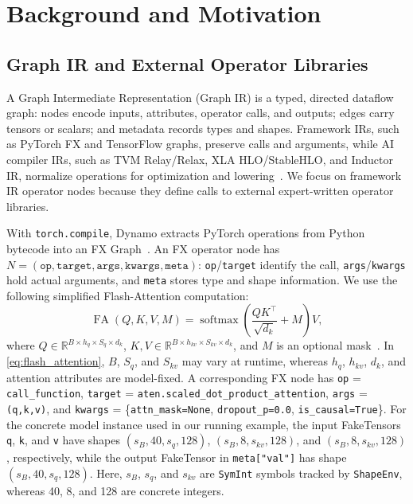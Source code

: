 \section{Background and Motivation}
\label{sec:motivation}

\subsection{Graph IR and External Operator Libraries}
\label{sec:background:graph-ir}

A Graph Intermediate Representation (Graph IR) is a typed, directed dataflow graph: nodes encode inputs, attributes, operator calls, and outputs; edges carry tensors or scalars; and metadata records types and shapes. Framework IRs, such as PyTorch FX and TensorFlow graphs, preserve calls and arguments, while AI compiler IRs, such as TVM Relay/Relax, XLA HLO/StableHLO, and Inductor IR, normalize operations for optimization and lowering~\cite{roesch2018relay,Lai2023RelaxCA,tensorflow2021xla,stablehlo2024,ansel2024dynamo}. We focus on framework IR operator nodes because they define calls to external expert-written operator libraries.

With \texttt{torch.compile}, Dynamo extracts PyTorch operations from Python bytecode into an FX Graph~\cite{paszke2019pytorch,ansel2024dynamo}. An FX operator node has $N=(\texttt{op},\texttt{target},\texttt{args},\texttt{kwargs},\texttt{meta})$: \texttt{op}/\texttt{target} identify the call, \texttt{args}/\texttt{kwargs} hold actual arguments, and \texttt{meta} stores type and shape information. We use the following simplified Flash-Attention computation:
\begin{equation}
	\operatorname{FA}(Q,K,V,M)
	=
	\operatorname{softmax}\left(\frac{QK^\top}{\sqrt{d_k}}+M\right)V,
	\label{eq:flash_attention}
\end{equation}
where $Q\in\mathbb{R}^{B\times h_q\times S_q\times d_k}$, $K,V\in\mathbb{R}^{B\times h_{kv}\times S_{kv}\times d_k}$, and $M$ is an optional mask~\cite{dao2024flashattention2}. In \autoref{eq:flash_attention}, $B$, $S_q$, and $S_{kv}$ may vary at runtime, whereas $h_q$, $h_{kv}$, $d_k$, and attention attributes are model-fixed. A corresponding FX node has \texttt{op} = \texttt{call\_function}, \texttt{target} = \texttt{aten.scaled\_dot\_product\_attention}, \texttt{args} = \texttt{(q,k,v)}, and \texttt{kwargs} = \{\texttt{attn\_mask=None}, \texttt{dropout\_p=0.0}, \texttt{is\_causal=True}\}. For the concrete model instance used in our running example, the input FakeTensors \texttt{q}, \texttt{k}, and \texttt{v} have shapes $(s_B,40,s_q,128)$, $(s_B,8,s_{kv},128)$, and $(s_B,8,s_{kv},128)$, respectively, while the output FakeTensor in \texttt{meta["val"]} has shape $(s_B,40,s_q,128)$. Here, $s_B$, $s_q$, and $s_{kv}$ are \texttt{SymInt} symbols tracked by \texttt{ShapeEnv}, whereas 40, 8, and 128 are concrete integers.

